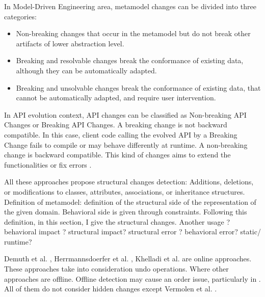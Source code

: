  In Model-Driven Engineering area, metamodel changes can be divided into three categories\cite{gruschko2007towards}:
 \begin{itemize}
 	
 \item	Non-breaking changes that occur in the metamodel but do not break other artifacts of lower abstraction level.%
  \item Breaking and resolvable changes break the conformance of existing data, although they can be automatically adapted.
 \item Breaking and unsolvable changes break the conformance of existing data, that cannot be automatically adapted, and require user intervention.
 \end{itemize}
 	In API evolution context, API changes can be classified as Non-breaking API Changes	or Breaking API Changes. A breaking change is not backward compatible. In this case, client code calling the evolved API by a Breaking Change fails to compile or may behave differently at runtime. A non-breaking change is backward compatible. This kind of changes aims to extend the functionalities or fix errors \cite{dig2006apis}.
 	
 	
 	



All these approaches propose structural changes detection: Additions, deletions, or modifications to classes, attributes, associations, or inheritance structures.
Definition of metamodel: definition of the structural side of the representation of the given domain. Behavioral side is given through constraints. Following this definition, in this section, I give the structural changes. Another usage ? behavioral impact ? structural impact? structural error ? behavioral error? static/ runtime? 


 

Demuth et al. \cite{demuth2015constraint}, Herrmannsdoerfer et al. \cite{herrmannsdoerfer2009cope}, Khelladi et al. \cite{khelladi2016detecting} are online approaches. These approaches take into consideration undo operations.
Where other approaches \cite{williams2012searching,10.1145/2000410.2000416,levendovszky2014semi,garces2009managing,cicchetti_managing_2009,langer_posteriori_2013,garcia2012model,xing2006refactoring,moghadam2012automated,vermolen_reconstructing_2012} are offline.  Offline detection may cause an order issue, particularly in \cite{williams2012searching,10.1145/2000410.2000416,levendovszky2014semi,garces2009managing,langer_posteriori_2013,garcia2012model,xing2006refactoring,moghadam2012automated}. 
All of them do not consider hidden changes except Vermolen et al. \cite{vermolen_reconstructing_2012}.



